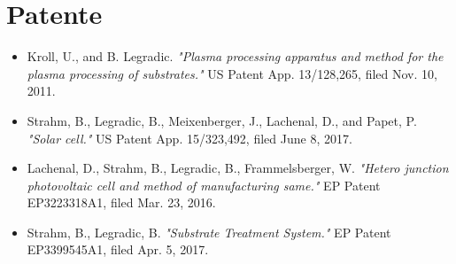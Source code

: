 \documentclass[verylight]{simplehipstercv}
\begin{document}
\section*{Patente}
\begin{itemize}
    \item Kroll, U., and B. Legradic. \textit{"Plasma processing apparatus and method for the plasma processing of substrates."} US Patent App. 13/128,265, filed Nov. 10, 2011.
    \item Strahm, B., Legradic, B., Meixenberger, J., Lachenal, D., and Papet, P. \textit{"Solar cell."} US Patent App. 15/323,492, filed June 8, 2017.
    \item Lachenal, D., Strahm, B., Legradic, B., Frammelsberger, W. \textit{"Hetero junction photovoltaic cell and method of manufacturing same."} EP Patent EP3223318A1, filed Mar. 23, 2016.
    \item Strahm, B., Legradic, B. \textit{"Substrate Treatment System."} EP Patent EP3399545A1, filed Apr. 5, 2017.
\end{itemize}
\end{document}
